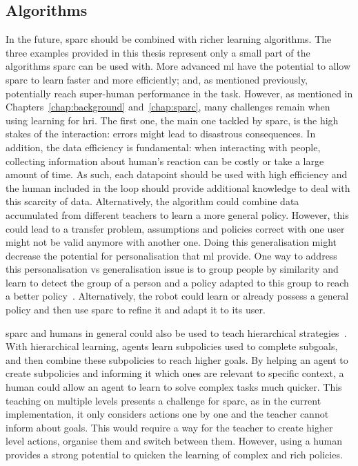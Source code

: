 \subsection{Algorithms}

In the future, \gls{sparc} should be combined with richer learning algorithms. The three examples provided in this thesis represent only a small part of the algorithms \gls{sparc} can be used with. More advanced \gls{ml} have the potential to allow \gls{sparc} to learn faster and more efficiently; and, as mentioned previously, potentially reach super-human performance in the task. However, as mentioned in Chapters~\ref{chap:background} and~\ref{chap:sparc}, many challenges remain when using learning for \gls{hri}. The first one, the main one tackled by \gls{sparc}, is the high stakes of the interaction: errors might lead to disastrous consequences. In addition, the data efficiency is fundamental: when interacting with people, collecting information about human's reaction can be costly or take a large amount of time. As such, each datapoint should be used with high efficiency and the human included in the loop should provide additional knowledge to deal with this scarcity of data. Alternatively, the algorithm could combine data accumulated from different teachers to learn a more general policy. However, this could lead to a transfer problem, assumptions and policies correct with one user might not be valid anymore with another one. Doing this generalisation might decrease the potential for personalisation that \gls{ml} provide. One way to address this personalisation vs generalisation issue is to group people by similarity and learn to detect the group of a person and a policy adapted to this group to reach a better policy~\citep{brunskill2014pac}. Alternatively, the robot could learn or already possess a general policy and then use \gls{sparc} to refine it and adapt it to its user. 

\gls{sparc} and humans in general could also be used to teach hierarchical strategies~\citep{barto2003recent}. With hierarchical learning, agents learn subpolicies used to complete subgoals, and then combine these subpolicies to reach higher goals. By helping an agent to create subpolicies and informing it which ones are relevant to specific context, a human could allow an agent to learn to solve complex tasks much quicker. This teaching on multiple levels presents a challenge for \gls{sparc}, as in the current implementation, it only considers actions one by one and the teacher cannot inform about goals. This would require a way for the teacher to create higher level actions, organise them and switch between them. However, using a human provides a strong potential to quicken the learning of complex and rich policies.

